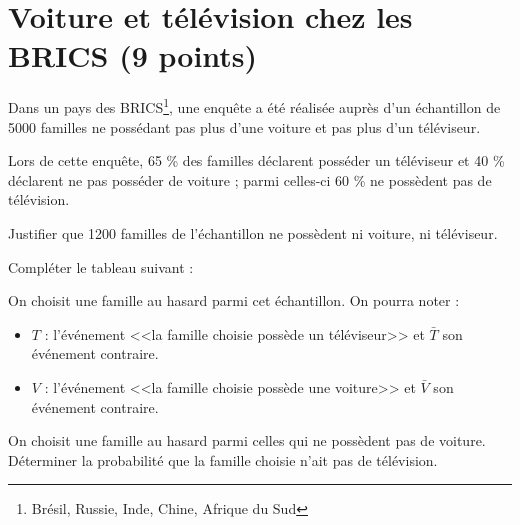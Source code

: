 \section{Voiture et télévision chez les BRICS (9 points)}

Dans un pays des BRICS\footnote{Brésil, Russie, Inde, Chine, Afrique du Sud}, une enquête a été réalisée auprès d'un échantillon  de 5000 familles ne possédant pas plus d'une voiture et pas plus d'un téléviseur.

Lors de cette enquête, 65 \% des familles déclarent posséder un téléviseur et 40 \% déclarent ne pas posséder de voiture ; parmi celles-ci 60 \% ne possèdent pas de télévision. 

\begin{questions}
	\question[1] Justifier que \num{1200} familles de l'échantillon ne possèdent ni voiture, ni téléviseur.
	
	\question[3] Compléter le tableau suivant :
	
		\begin{center}
			
		\end{center}
	
	\question[3] On choisit une famille au hasard parmi cet échantillon. 
	On pourra noter :
	
	\begin{itemize}
		\item $T$ : l'événement <<la famille choisie possède un téléviseur>> et $\bar{T}$ son événement contraire.
		
		\item $V$ : l'événement <<la famille choisie possède une voiture>> et $\bar{V}$ son événement contraire.
	\end{itemize}


	\question[2] On choisit une famille au hasard parmi celles qui ne possèdent pas de voiture. Déterminer la probabilité que la famille choisie n'ait pas de télévision.
	
\end{questions}